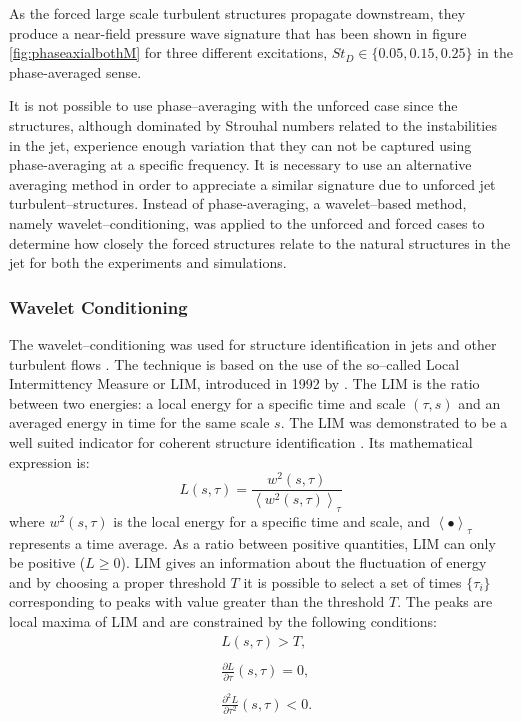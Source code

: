 As the forced large scale turbulent structures propagate downstream, they produce a near-field pressure wave signature that has been shown in figure \ref{fig:phaseaxialbothM} for three different excitations, $St_D \in \{ 0.05, 0.15, 0.25 \}$ in the phase-averaged sense. %

It is not possible to use phase--averaging with the unforced case since the structures, although dominated by Strouhal numbers related to the instabilities in the jet, experience enough variation that they can not be captured using phase-averaging at a specific frequency. 
It is necessary to use an alternative averaging method in order to appreciate a similar signature due to unforced jet turbulent--structures.
Instead of phase-averaging, a wavelet--based method, namely wavelet--conditioning, was applied to the unforced and forced cases to determine how closely the forced structures relate to the natural structures in the jet for both the experiments and simulations.

\subsubsection{Wavelet Conditioning}
The wavelet--conditioning was used for structure identification in jets and other turbulent flows \citep{Camussi1997,Camussi1997b,Guj1999,Camussi2002,Guj2003}.
The technique is based on the use of the so--called Local Intermittency Measure or LIM, introduced in 1992 by \citet{Farge1992}.
The LIM is the ratio between two energies: a local energy for a specific time and scale $(\tau, s)$ and an averaged energy in time for the same scale $s$.
The LIM was demonstrated to be a well suited indicator for coherent structure identification \citet{Camussi1997}. Its mathematical expression is:
\begin{equation}
\label{eqn:LIM}
L(s, \tau) = \frac{w^{2}(s, \tau)}{\left<w^{2}(s, \tau)\right>_{\tau}}
\end{equation}
where $w^{2}(s, \tau)$ is the local energy for a specific time and scale, and $\left< \bullet \right>_{\tau}$ represents a time average.
As a ratio between positive quantities, LIM can only be positive ($L \geqslant 0 $). LIM gives an information about the fluctuation of energy and by choosing a proper threshold $T$ it is possible to select a set of times $\{\tau_{i}\}$ corresponding to peaks with value greater than the threshold $T$.
The peaks are local maxima of LIM and are constrained by the following conditions:
\begin{equation}
		\begin{array}{ll}
			& L(s, \tau) > T,\\
			\\
			& \frac{\partial L}{\partial \tau}(s, \tau) = 0,\\
			\\
			&\frac{\partial^{2} L}{\partial \tau^{2}}(s, \tau) < 0.
		\end{array}
\end{equation}

